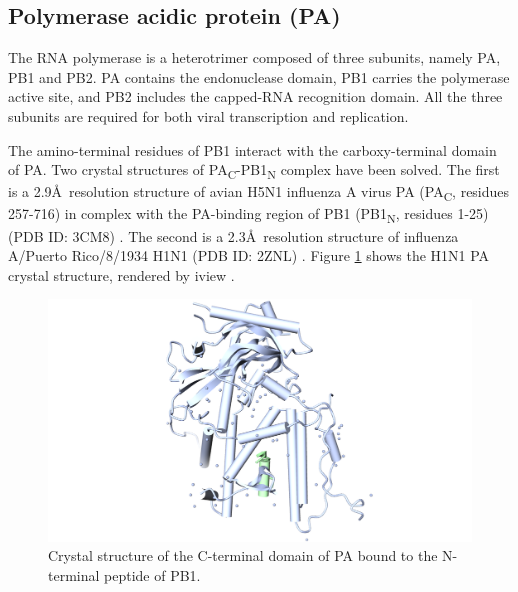 \subsection{Polymerase acidic protein (PA)}

The RNA polymerase is a heterotrimer composed of three subunits, namely PA, PB1 and PB2. PA contains the endonuclease domain, PB1 carries the polymerase active site, and PB2 includes the capped-RNA recognition domain. All the three subunits are required for both viral transcription and replication.%

The amino-terminal residues of PB1 interact with the carboxy-terminal domain of PA. Two crystal structures of PA\textsubscript{C}-PB1\textsubscript{N} complex have been solved. The first is a 2.9\AA\ resolution structure of avian H5N1 influenza A virus PA (PA\textsubscript{C}, residues 257-716) in complex with the PA-binding region of PB1 (PB1\textsubscript{N}, residues 1-25) (PDB ID: 3CM8) \citep{1540}. The second is a 2.3\AA\ resolution structure of influenza A/Puerto Rico/8/1934 H1N1 (PDB ID: 2ZNL) \citep{1141}. Figure \ref{influenza:2ZNL} shows the H1N1 PA crystal structure, rendered by iview \citep{1366}.

\begin{figure}
\centering
\includegraphics[width=\linewidth]{../influenza/2ZNL.png}
\caption{Crystal structure of the C-terminal domain of PA bound to the N-terminal peptide of PB1.}
\label{influenza:2ZNL}
\end{figure}

